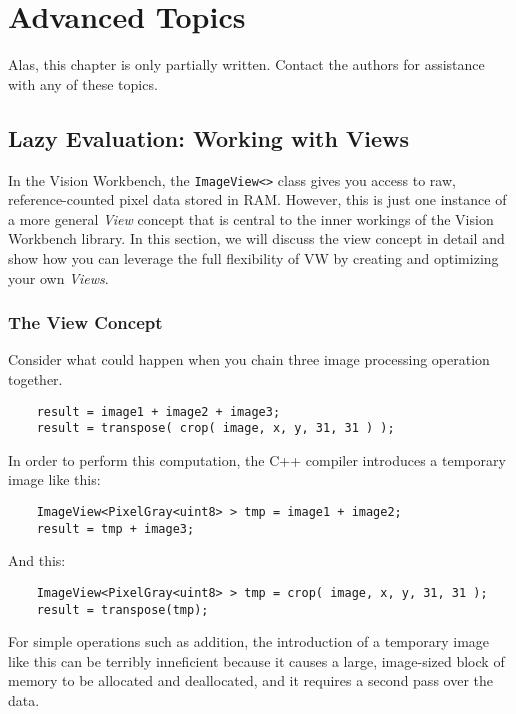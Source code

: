 \chapter{Advanced Topics}\label{ch:advanced-topics}

Alas, this chapter is only partially written.  Contact the authors for
assistance with any of these topics.

\section{Lazy Evaluation: Working with Views}\label{sec:views}

In the Vision Workbench, the \verb#ImageView<># class gives you access
to raw, reference-counted pixel data stored in RAM.  However, this is
just one instance of a more general {\em View} concept that is central
to the inner workings of the Vision Workbench library.  In this
section, we will discuss the view concept in detail and show how you
can leverage the full flexibility of VW by creating and optimizing
your own {\em Views}.

\subsection {The View Concept}

Consider what could happen when you chain three image processing
operation together.

\begin{verbatim}
    result = image1 + image2 + image3;
    result = transpose( crop( image, x, y, 31, 31 ) );
\end{verbatim}

In order to perform this computation, the C++ compiler introduces a
temporary image like this:

\begin{verbatim}
    ImageView<PixelGray<uint8> > tmp = image1 + image2;
    result = tmp + image3;
\end{verbatim}

And this:

\begin{verbatim}
    ImageView<PixelGray<uint8> > tmp = crop( image, x, y, 31, 31 );
    result = transpose(tmp);
\end{verbatim}

For simple operations such as addition, the introduction of a
temporary image like this can be terribly inneficient because it
causes a large, image-sized block of memory to be allocated and
deallocated, and it requires a second pass over the data.  

